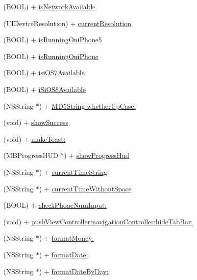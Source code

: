 \begin{DoxyCompactItemize}
\item 
(B\+O\+O\+L) + \hyperlink{interface_util_a344afa0140847ec221b1dbbcb04687f3}{is\+Network\+Available}
\item 
(U\+I\+Device\+Resolution) + \hyperlink{interface_util_ae8ae525e6770b696470ef18e3daaa2da}{current\+Resolution}
\item 
(B\+O\+O\+L) + \hyperlink{interface_util_ae29979775a0bc59108a2b8a6b47b0e2f}{is\+Running\+Oni\+Phone5}
\item 
(B\+O\+O\+L) + \hyperlink{interface_util_a1034ee0415e04b31875019f4c6bb96f1}{is\+Running\+Oni\+Phone}
\item 
(B\+O\+O\+L) + \hyperlink{interface_util_a65978baa276483a8bedff6b046eeeac1}{isi\+O\+S7\+Available}
\item 
(B\+O\+O\+L) + \hyperlink{interface_util_a27325e3210aa14c4aaafdf576329b828}{i\+Si\+O\+S8\+Available}
\item 
(N\+S\+String $\ast$) + \hyperlink{interface_util_a688fa2c31a825862e4059d4a37d87fa9}{M\+D5\+String\+:whether\+Up\+Case\+:}
\item 
(void) + \hyperlink{interface_util_a473a8c494766a9977139f3380efcd57e}{show\+Success}
\item 
(void) + \hyperlink{interface_util_a3bd6f354bd8aa2ec5bfc82009fcd026c}{make\+Toast\+:}
\item 
(M\+B\+Progress\+H\+U\+D $\ast$) + \hyperlink{interface_util_a2c46fb9ccbaf2328d22ec8b30fb08a7c}{show\+Progress\+Hud}
\item 
(N\+S\+String $\ast$) + \hyperlink{interface_util_a2b2160411cd3b13359ea0466b75d7c36}{current\+Time\+String}
\item 
(N\+S\+String $\ast$) + \hyperlink{interface_util_a0492aa8f02fc7d15ec1eb0ee3dbf9cc3}{current\+Time\+Without\+Space}
\item 
(B\+O\+O\+L) + \hyperlink{interface_util_a9e66070d674ed5d1750b70c6fbdedb9c}{check\+Phone\+Num\+Input\+:}
\item 
(void) + \hyperlink{interface_util_aecb38c60d70c7f77d578b7cc72056a6a}{push\+View\+Controller\+:navigation\+Controller\+:hide\+Tab\+Bar\+:}
\item 
(N\+S\+String $\ast$) + \hyperlink{interface_util_a07cf090688bfd3ed6cb0ba5d7ac5d6b1}{format\+Money\+:}
\item 
(N\+S\+String $\ast$) + \hyperlink{interface_util_af44a00916844095c45277978b3297f3c}{format\+Date\+:}
\item 
(N\+S\+String $\ast$) + \hyperlink{interface_util_acbee7aff4b5986e8fde1edf4d5cf0f9b}{format\+Date\+By\+Day\+:}

\end{DoxyCompactItemize}
